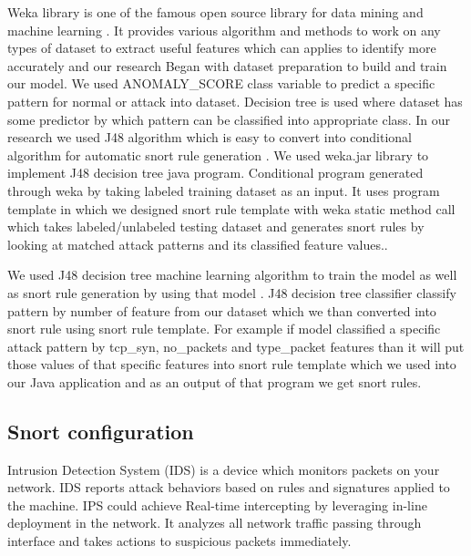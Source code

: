 Weka library is one of the famous open source library for data mining and machine learning \cite{misc:wekaTutorial}. It provides various algorithm and methods to work on any types of dataset to extract useful features which can applies to identify more accurately and our research Began with dataset preparation to build and train our model. We used ANOMALY\_SCORE class variable to predict a specific pattern for normal or attack into dataset. Decision tree is used where dataset has some predictor by which pattern can be classified into appropriate class. In our research we used J48 algorithm which is easy to convert into conditional algorithm for automatic snort rule generation \cite{misc:weka.jar}. We used weka.jar library to implement J48 decision tree java program. Conditional program generated through weka by taking labeled training dataset as an input. It uses program template in which we designed snort rule template with weka static method call which takes labeled/unlabeled testing dataset and generates snort rules by looking at matched attack patterns and its classified feature values..

We used J48 decision tree machine learning algorithm to train the model as well as snort rule generation by using that model \cite{NIDusingDT}. J48 decision tree classifier classify pattern by number of feature from our dataset which we than converted into snort rule using snort rule template. For example if model classified a specific attack pattern by tcp\_syn, no\_packets and type\_packet features than it will put those values of that specific features into snort rule template which we used into our Java application and as an output of that program we get snort rules.



\subsection{Snort configuration}

Intrusion Detection System (IDS) is a device which monitors packets on your network. IDS reports attack behaviors based on rules and signatures applied to the machine. IPS could achieve Real-time intercepting by leveraging in-line deployment in the network. It analyzes all network traffic passing through interface and takes actions to suspicious packets immediately\cite{misc:netfilter}.

